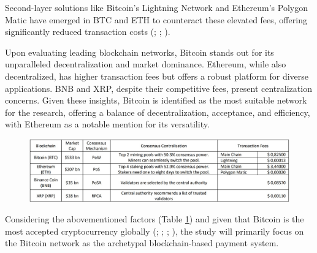 \documentclass[twocolumn]{article}
\begin{document}
Second-layer solutions like Bitcoin's Lightning Network and Ethereum's Polygon Matic have emerged in BTC and ETH to counteract these elevated fees, offering significantly reduced transaction costs (\cite{bertucci_incentives_2020}; \cite{noauthor_lightning_2023}; \cite{prieto_blockchain_2020}).

Upon evaluating leading blockchain networks, Bitcoin stands out for its unparalleled decentralization and market dominance. Ethereum, while also decentralized, has higher transaction fees but offers a robust platform for diverse applications. BNB and XRP, despite their competitive fees, present centralization concerns. Given these insights, Bitcoin is identified as the most suitable network for the research, offering a balance of decentralization, acceptance, and efficiency, with Ethereum as a notable mention for its versatility.

\begin{figure}[hb]
    \centering
    \includegraphics[width=0.9\linewidth]{Blockchains_comparison.jpg}
    \label{tab:Comparative} 
\end{figure}


Considering the abovementioned factors (Table \ref{tab:Comparative}) and given that Bitcoin is the most accepted cryptocurrency globally (\cite{davis_cryptocurrency_2023}; \cite{flynn_how_2022}; \cite{mallqui_predicting_2019}; \cite{vejacka_basic_2014}), the study will primarily focus on the Bitcoin network as the archetypal blockchain-based payment system.

    
\clearpage
\end{document}
